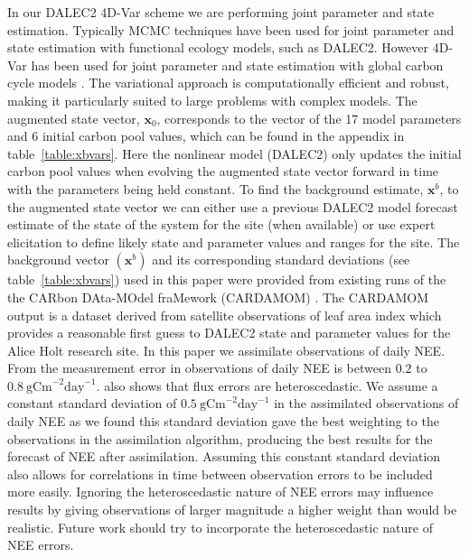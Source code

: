 \documentclass[review]{elsarticle}
\begin{document}
In our DALEC2 4D-Var scheme we are performing joint parameter and state estimation. Typically MCMC techniques have been used for joint parameter and state estimation with functional ecology models, such as DALEC2. However 4D-Var has been used for joint parameter and state estimation with global carbon cycle models \citep{Kaminski2013}. The variational approach is computationally efficient and robust, making it particularly suited to large problems with complex models. The augmented state vector, $\textbf{x}_0$, corresponds to the vector of the 17 model parameters and 6 initial carbon pool values, which can be found in the appendix in table~\ref{table:xbvars}. Here the nonlinear model (DALEC2) only updates the initial carbon pool values when evolving the augmented state vector forward in time with the parameters being held constant. To find the background estimate, $\textbf{x}^{b}$, to the augmented state vector we can either use a previous DALEC2 model forecast estimate of the state of the system for the site (when available) or use expert elicitation to define likely state and parameter values and ranges for the site. The background vector $(\textbf{x}^b)$ and its corresponding standard deviations (see table~\ref{table:xbvars}) used in this paper were provided from existing runs of the the CARbon DAta-MOdel fraMework (CARDAMOM) \citep{Exbrayat2015}. The CARDAMOM output is a dataset derived from satellite observations of leaf area index which provides a reasonable first guess to DALEC2 state and parameter values for the Alice Holt research site. In this paper we assimilate observations of daily NEE. From \citet{Richardson200838} the measurement error in observations of daily NEE is between $0.2$ to $0.8~\text{gCm}^{-2}\text{day}^{-1}$.  \citet{Richardson200838} also shows that flux errors are heteroscedastic. We assume a constant standard deviation of $0.5~\text{gCm}^{-2}\text{day}^{-1}$ in the assimilated observations of daily NEE as we found this standard deviation gave the best weighting to the observations in the assimilation algorithm, producing the best results for the forecast of NEE after assimilation. Assuming this constant standard deviation also allows for correlations in time between observation errors to be included more easily. Ignoring the heteroscedastic nature of NEE errors may influence results by giving observations of larger magnitude a higher weight than would be realistic. Future work should try to incorporate the heteroscedastic nature of NEE errors.
\end{document}
